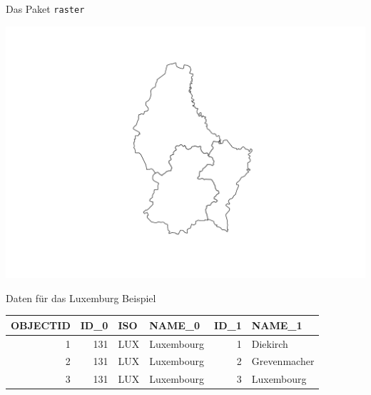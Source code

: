 \begin{frame}[fragile]{Das Paket \texttt{raster}}

\begin{Shaded}
\begin{Highlighting}[]
\StringTok{ }\NormalTok{(}\NormalTok{, }\NormalTok{, }\NormalTok{)}
\end{Highlighting}
\end{Shaded}

\includegraphics{ps_user_stuttgart_part3_files/figure-beamer/unnamed-chunk-9-1.pdf}

\end{frame}

\begin{frame}[fragile]{Daten für das Luxemburg Beispiel}

\begin{Shaded}
\begin{Highlighting}[]
\NormalTok{(}\NormalTok{data[,}\OperatorTok{:}\NormalTok{]))}
\end{Highlighting}
\end{Shaded}

\begin{longtable}[]{@{}rrllrl@{}}
\toprule
OBJECTID & ID\_0 & ISO & NAME\_0 & ID\_1 & NAME\_1\tabularnewline
\midrule
\endhead
1 & 131 & LUX & Luxembourg & 1 & Diekirch\tabularnewline
2 & 131 & LUX & Luxembourg & 2 & Grevenmacher\tabularnewline
3 & 131 & LUX & Luxembourg & 3 & Luxembourg\tabularnewline
\bottomrule
\end{longtable}

\end{frame}

